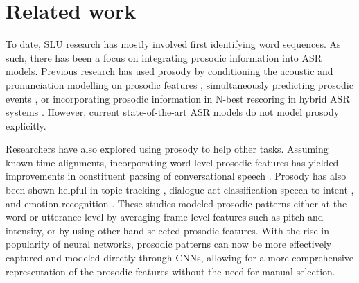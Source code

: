 \section{Related work}
To date, SLU research has mostly involved first identifying word sequences.  As such, there has been a focus on integrating prosodic information into ASR models. Previous research has used prosody by conditioning the acoustic and pronunciation modelling on prosodic features \cite{Shriberg, 1561280}, simultaneously predicting prosodic events \cite{chen2003prosody,Hasegawa-Johnson}, or incorporating prosodic information in N-best rescoring in hybrid ASR systems \cite{4218240,Ananthakrishnan, huang10_speechprosody}. However, current state-of-the-art ASR models do not model prosody explicitly. 

Researchers have also explored using prosody to help other tasks.  Assuming known time alignments, incorporating word-level prosodic features has yielded improvements in constituent parsing of conversational speech \cite{tran-etal-2018-parsing, Tran2019OnTR}. Prosody has also been shown helpful in topic tracking \cite{guinaudeau11_interspeech}, dialogue act classification \cite{wei2022neuralprosodyencoderendroend} speech to intent \cite{rajaa23_interspeech}, and emotion recognition \cite{Luengo2005AutomaticER,naderi2023cross}. These studies modeled prosodic patterns either at the word or utterance level by averaging frame-level features such as pitch and intensity, or by using other hand-selected prosodic features. With the rise in popularity of neural networks, prosodic patterns can now be more effectively captured and modeled directly through CNNs, allowing for a more comprehensive representation of the prosodic features without the need for manual selection. 

